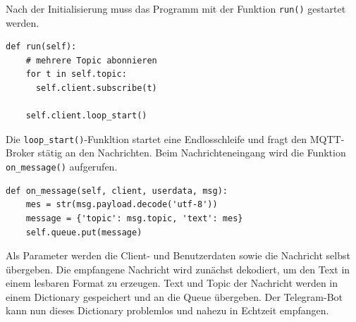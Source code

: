 \documentclass[12pt, letterpaper]{article}
\begin{document}
\par Nach der Initialisierung muss das Programm mit der Funktion \texttt{run()} gestartet werden.
\begin{lstlisting}[frame=single, style=py, caption={mqtt.py: run()}]
  def run(self):
    # mehrere Topic abonnieren
    for t in self.topic:
      self.client.subscribe(t)
    
    self.client.loop_start()
\end{lstlisting}
\par Die \texttt{loop\_start()}-Funkltion startet eine Endlosschleife und fragt den MQTT-Broker stätig an den Nachrichten. Beim Nachrichteneingang wird die Funktion \texttt{on\_message()} aufgerufen. 
\begin{lstlisting}[style=py, caption={mqtt.py: on\_message()}]
  def on_message(self, client, userdata, msg):
    mes = str(msg.payload.decode('utf-8'))
    message = {'topic': msg.topic, 'text': mes}
    self.queue.put(message)
\end{lstlisting}
\par Als Parameter werden die Client- und Benutzerdaten sowie die Nachricht selbst übergeben. Die empfangene Nachricht wird zunächst dekodiert, um den Text in einem lesbaren Format zu erzeugen. Text und Topic der Nachricht werden in einem Dictionary gespeichert und an die Queue übergeben. Der Telegram-Bot kann nun dieses Dictionary problemlos und nahezu in Echtzeit empfangen.
\end{document}
